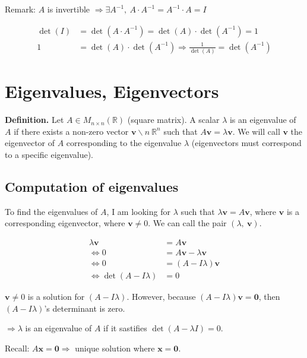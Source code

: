 \documentclass[
]{article}
\begin{document}
Remark: $A$ is invertible
$\Rightarrow \exists A^{- 1},\ A \cdot A^{- 1} = A^{- 1} \cdot A = I$

\begin{align*}
\det(I) &= \det\left( A \cdot A^{- 1} \right) = \det(A) \cdot \det\left( A^{- 1} \right) = 1
 \\
1 &= \det(A) \cdot \det\left( A^{- 1} \right) \Rightarrow \frac{1}{\det(A)} = \det\left( A^{- 1} \right)
\end{align*}



\section{Eigenvalues, Eigenvectors}

\textbf{Definition.} Let
$A \in M_{n \times n}\left( \mathbb{R} \right)$ (square matrix). A
scalar $\lambda$ is an eigenvalue of $A$ if there exists a non-zero
vector $\mathbf{v}\backslash n\ \mathbb{R}^{n}$ such that
$A\mathbf{v} = \lambda\mathbf{v}$. We will call
$\mathbf{v}$ the eigenvector of $A$ corresponding to the
eigenvalue $\lambda$ (eigenvectors must correspond to a specific
eigenvalue).


\subsection{Computation of
eigenvalues}

To find the eigenvalues of $A$, I am looking for $\lambda$ such that
$\lambda\mathbf{v} = A\mathbf{v}$, where $\mathbf{v}$ is
a corresponding eigenvector, where $\mathbf{v} \neq 0$. We can
call the pair $\left( \lambda,\ \mathbf{v} \right)$.

\begin{align*}
\lambda\mathbf{v} &= A\mathbf{v}
 \\
\Leftrightarrow 0 &= A\mathbf{v} - \lambda\mathbf{v}
 \\
\Leftrightarrow 0 &= (A - I\lambda)\mathbf{v}
 \\
\Leftrightarrow \det(A - I\lambda) &= 0
\end{align*}


$\mathbf{v} \neq 0$ is a solution for $(A - I\lambda)$. However,
because $(A - I\lambda)\mathbf{v} = \mathbf{0}$, then
$(A - I\lambda)$'s determinant is zero.

$\Rightarrow \lambda$ is an eigenvalue of $A$ if it sastifies
$\det(A - \lambda I) = 0$.

Recall: $A\mathbf{x} = \mathbf{0} \Rightarrow$ unique solution
where $\mathbf{x} = \mathbf{0}$.
\end{document}

